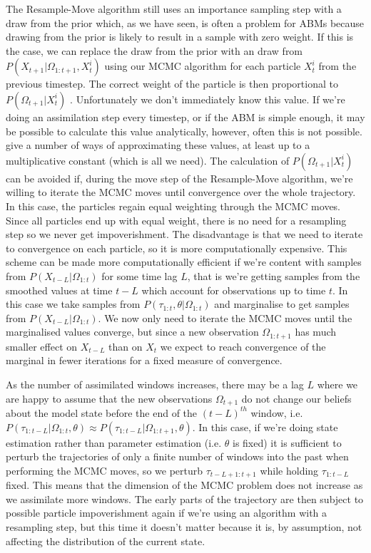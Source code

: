 \documentclass{article}
\begin{document}
The Resample-Move algorithm still uses an importance sampling step with a draw from the prior which, as we have seen, is often a problem for ABMs because drawing from the prior is likely to result in a sample with zero weight. If this is the case, we can replace the draw from the prior with an draw from $P(X_{t+1}|\Omega_{1:{t+1}},X^i_t)$ using our MCMC algorithm for each particle $X^i_t$ from the previous timestep. The correct weight of the particle is then proportional to $P(\Omega_{t+1}|X^i_t)$ \citep{doucet2009tutorial}. Unfortunately we don't immediately know this value. If we're doing an assimilation step every timestep, or if the ABM is simple enough, it may be possible to calculate this value analytically, however, often this is not possible.   \citet*{han2001markov, newton1994approximate, stefankovic2009adaptive} give a number of ways of approximating these values, at least up to a multiplicative constant (which is all we need). The calculation of $P(\Omega_{t+1}|X^i_t)$ can be avoided if, during the move step of the Resample-Move algorithm, we're willing to iterate the MCMC moves until convergence over the whole trajectory. In this case, the particles regain equal weighting through the MCMC moves. Since all particles end up with equal weight, there is no need for a resampling step so we never get impoverishment. The disadvantage is that we need to iterate to convergence on each particle, so it is more computationally expensive. This scheme can be made more computationally efficient if we're content with samples from $P(X_{t-L}|\Omega_{1:t})$ for some time lag $L$, that is we're getting samples from the smoothed values at time $t-L$ which account for observations up to time $t$. In this case we take samples from $P(\tau_{1:t},\theta|\Omega_{1:t})$ and marginalise to get samples from $P(X_{t-L}|\Omega_{1:t})$. We now only need to iterate the MCMC moves until the marginalised values converge, but since a new observation $\Omega_{1:t+1}$ has much smaller effect on $X_{t-L}$ than on $X_{t}$ we expect to reach convergence of the marginal in fewer iterations for a fixed measure of convergence.

As the number of assimilated windows increases, there may be a lag $L$ where we are happy to assume that the new observations $\Omega_{t+1}$ do not change our beliefs about the model state before the end of the $(t-L)^{th}$ window, i.e. $P(\tau_{1:t-L}|\Omega_{1:t},\theta) \approx P(\tau_{1:t-L}|\Omega_{1:t+1},\theta)$. In this case, if we're doing state estimation rather than parameter estimation (i.e. $\theta$ is fixed) it is sufficient to perturb the trajectories of only a finite number of windows into the past when performing the MCMC moves, so we perturb $\tau_{t-L+1:t+1}$ while holding $\tau_{1:t-L}$ fixed. This means that the dimension of the MCMC problem does not increase as we assimilate more windows. The early parts of the trajectory are then subject to possible particle impoverishment again if we're using an algorithm with a resampling step, but this time it doesn't matter because it is, by assumption, not affecting the distribution of the current state.
\end{document}

